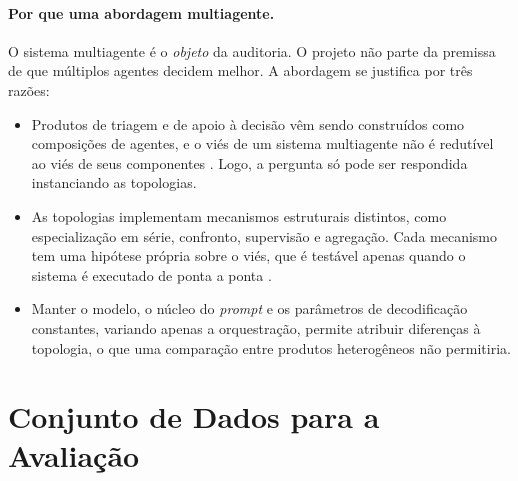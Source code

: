 \documentclass[12pt]{article}
\begin{document}
\paragraph{Por que uma abordagem multiagente.} O sistema multiagente é o \emph{objeto} da auditoria. O projeto não parte da premissa de que múltiplos agentes decidem melhor. A abordagem se justifica por três razões:
\begin{itemize}
    \item Produtos de triagem e de apoio à decisão vêm sendo construídos como composições de agentes, e o viés de um sistema multiagente não é redutível ao viés de seus componentes \citep{madigan2025emergent}. Logo, a pergunta só pode ser respondida instanciando as topologias.
    \item As topologias implementam mecanismos estruturais distintos, como especialização em série, confronto, supervisão e agregação. Cada mecanismo tem uma hipótese própria sobre o viés, que é testável apenas quando o sistema é executado de ponta a ponta \citep{okawa2026emergence,li2026aligned}.
    \item Manter o modelo, o núcleo do \textit{prompt} e os parâmetros de decodificação constantes, variando apenas a orquestração, permite atribuir diferenças à topologia, o que uma comparação entre produtos heterogêneos não permitiria.
\end{itemize}

\section{Conjunto de Dados para a Avaliação}
\label{sec:dados}
\end{document}
